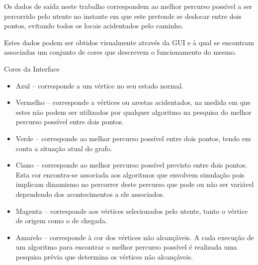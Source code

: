 \documentclass[relatorio.tex]{subfiles}
\begin{document}
Os dados de saída neste trabalho correspondem
ao melhor percurso possível a ser percorrido pelo utente no instante
em que este pretende se deslocar entre dois pontos, evitando todos
os locais acidentados pelo caminho.

Estes dados podem ser obtidos visualmente através da GUI
e à qual se encontram associadas um conjunto de cores que
descrevem o funcionamento do mesmo.

\begin{table}
\caption{Cores da Interface}
\label{tab:colors}
\begin{itemize}
\item Azul -- corresponde a um vértice no seu estado normal.
\item Vermelho -- corresponde a vértices ou arestas acidentados, na medida em que estes
não podem ser utilizados por qualquer algoritmo na pesquisa do melhor percurso
possível entre dois pontos.
\item Verde -- corresponde ao melhor percurso possível entre dois pontos,
tendo em conta a situação atual do grafo.
\item Ciano -- corresponde ao melhor percurso possível previsto entre dois pontos.
Esta cor encontra-se associada aos algoritmos que envolvem simulação pois
implicam dinamismo no percorrer deste percurso que pode ou não ser variável
dependendo dos acontecimentos a ele associados.
\item Magenta -- corresponde aos vértices selecionados pelo utente,
tanto o vértice de origem como o de chegada.
\item Amarelo -- corresponde à cor dos vértices não alcançáveis.
A cada execução de um algoritmo para encontrar o melhor percurso possível
é realizada uma pesquisa prévia que determina os vértices não alcançáveis.
\end{itemize}
\end{table}
\end{document}
